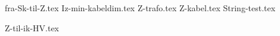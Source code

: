 \usepackage[utf8]{inputenc}%
\usepackage{amsmath}%
\usepackage{mathtools}%
\usepackage{icomma}%
\usepackage{siunitx}%
\usepackage{fp}%
\usepackage{xstring}%
\usepackage{import}
\usepackage{listofitems}
\usepackage{ifthen}


{fra-Sk-til-Z.tex}
{Iz-min-kabeldim.tex}
{Z-trafo.tex}
{Z-kabel.tex}
{String-test.tex}

{Z-til-ik-HV.tex}